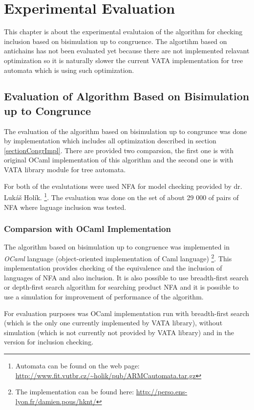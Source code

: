 \chapter{Experimental Evaluation}
\label{eval}
This chapter is about the experimental evalutaion of the algorithm for checking inclusion based on bisimulation up to congruence. The algortihm based on antichains
has not been evaluated yet because there are not implemented relavant optimization so it is naturally slower the current VATA implementation for tree automata
which is using such optimization.

\section{Evaluation of Algorithm Based on Bisimulation up to Congrunce}
The evaluation of the algorithm based on bisimulation up to congrunce was done by implementation which includes all optimization described in section 
\ref{sectionCongrImpl}. There are provided two comparsion, the first one is with original OCaml implementation of this algorithm and the second one is with
VATA library module for tree automata.

For both of the evalutations were used NFA for model checking provided by dr. Lukáš Holík.
\footnote{Automata can be found on the web page: \url{http://www.fit.vutbr.cz/~holik/pub/ARMCautomata.tar.gz}}.  
The evaluation was done on the set of about 29 000 of pairs of NFA where laguage inclusion was tested. 

\subsection{Comparsion with OCaml Implementation}
The algorithm based on bisimulation up to congruence was implemented in \emph{OCaml} language (object-oriented implementation of Caml language)
\footnote{The implementation can be found here: \url{http://perso.ens-lyon.fr/damien.pous/hknt/}}. This implementation provides checking of the equivalence
and the inclusion of languages of NFA and also inclusion. It is also possible to use breadth-first search or depth-first search algorithm for searching 
product NFA and it is possible to use a simulation for improvement of performance of the algorithm.

For evaluation purposes was OCaml implementation run with breadth-first search (which is the only one currently implemented by VATA library), without
simulation (which is not currently not provided by VATA library) and in the version for inclusion checking.

